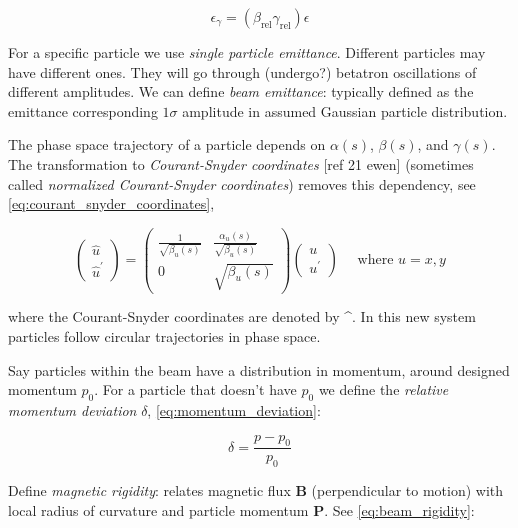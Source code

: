 \begin{equation}
    \epsilon_{\gamma} = (\beta_{\mathrm{rel}} \gamma_{\mathrm{rel}}) \epsilon
    \label{eq:normalized_emittance}
\end{equation}
\bigbreak

For a specific particle we use \emph{single particle emittance}.
Different particles may have different ones.
They will go through (undergo?) betatron oscillations of different amplitudes.
We can define \emph{beam emittance}: typically defined as the emittance corresponding $1\sigma$ amplitude in assumed Gaussian particle distribution.
\bigbreak

The phase space trajectory of a particle depends on $\alpha(s)$, $\beta(s)$, and $\gamma(s)$.
The transformation to \emph{Courant-Snyder coordinates} [ref 21 ewen] (sometimes called \emph{normalized Courant-Snyder coordinates}) removes this dependency, see \cref{eq:courant_snyder_coordinates},
\bigbreak

\begin{equation}
    \left(\begin{array}{c}
    \hat{u} \\
    \hat{u}^{\prime}
    \end{array}\right) = \left(\begin{array}{cc}
    \frac{1}{\sqrt{\beta_{u}(s)}} & \frac{\alpha_{u}(s)}{\sqrt{\beta_{u}(s)}} \\
    0 & \sqrt{\beta_{u}(s)}
    \end{array}\right)\left(\begin{array}{c}
    u \\
    u^{\prime}
    \end{array}\right) \quad \text{ where } u = x, y
    \label{eq:courant_snyder_coordinates}
\end{equation}

where the Courant-Snyder coordinates are denoted by \^{}.
In this new system particles follow circular trajectories in phase space.
\bigbreak

Say particles within the beam have a distribution in momentum, around designed momentum $p_0$.
For a particle that doesn't have $p_0$ we define the \textit{relative momentum deviation} $\delta$, \cref{eq:momentum_deviation}:
\bigbreak

\begin{equation}
    \delta = \frac{p - p_0}{p_0}
    \label{eq:momentum_deviation}
\end{equation}
\bigbreak

Define \textit{magnetic rigidity}: relates magnetic flux $\mathbf{B}$ (perpendicular to motion) with local radius of curvature and particle momentum $\mathbf{P}$.
See \cref{eq:beam_rigidity}:
\bigbreak

